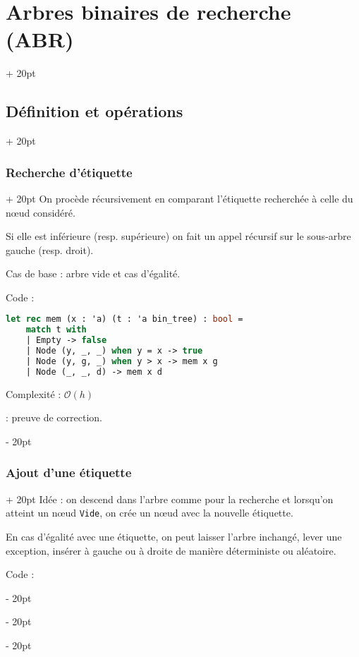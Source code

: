 \documentclass[a4paper, 12pt, twoside]{article}
\newcommand{\ind}[1][20pt]{\advance\leftskip + #1}
\newcommand{\deind}[1][20pt]{\advance\leftskip - #1}
\newenvironment{indt}[2][20pt]{#2 \par \ind[#1]}{\par \deind} %
\begin{document}
\begin{indt}{\section{Arbres binaires de recherche (ABR)}}
\begin{indt}{\subsection{Définition et opérations}}
            \vspace{12pt}
            
            \begin{indt}{\subsubsection{Recherche d'étiquette}}
                On procède récursivement en comparant l'étiquette recherchée à celle du n\oe ud considéré.
                
                Si elle est inférieure (resp. supérieure) on fait un appel récursif sur le sous-arbre gauche (resp. droit).
                
                Cas de base : arbre vide et cas d'égalité.
                
                Code :
                
                \begin{lstlisting}[language=Caml, xleftmargin=80pt]
let rec mem (x : 'a) (t : 'a bin_tree) : bool =
    match t with
    | Empty -> false
    | Node (y, _, _) when y = x -> true
    | Node (y, g, _) when y > x -> mem x g
    | Node (_, _, d) -> mem x d\end{lstlisting}
                
                Complexité : $\mathcal O(h)$
                
                 : preuve de correction.
            \end{indt}
            
            \vspace{12pt}
            
            \begin{indt}{\subsubsection{Ajout d'une étiquette}}
                Idée : on descend dans l'arbre comme pour la recherche et lorsqu'on atteint un n\oe ud \texttt{Vide}, on crée un n\oe ud avec la nouvelle étiquette.
                
                En cas d'égalité avec une étiquette, on peut laisser l'arbre inchangé, lever une exception, insérer à gauche ou à droite de manière déterministe ou aléatoire.
                
                \vspace{6pt}
                
                Code :
                

\end{indt}
\end{indt}
\end{indt}
\end{document}
